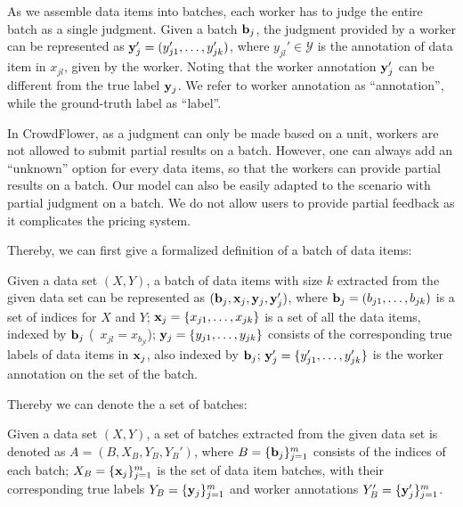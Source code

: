 
%

As we assemble data items into batches, 
each worker has to judge the entire batch as a single judgment.  
Given a batch ${\mathbf{b}}_j$, the judgment provided by a worker can be represented as ${\mathbf{y}}_j' = (y_{j1}', \ldots, y_{jk}')$, 
where $y_{jl}' \in \mathcal{Y}$ is the annotation of data item in $x_{jl}$, given by the worker.
Noting that the worker annotation ${\mathbf{y}}_j'$ can be different from the true label ${\mathbf{y}}_j$.  
We refer to worker annotation as ``annotation'', while the ground-truth label as ``label''.  

In CrowdFlower, as a judgment can only be made based on a unit,
workers are not allowed to submit partial results on a batch.
However, one can always add an ``unknown'' option for every data items,
so that the workers can provide partial results on a batch.
Our model can also be easily adapted to the scenario with partial judgment on a batch.
We do not allow users to provide partial feedback as it complicates the pricing system.  


Thereby, we can first give a formalized definition of a batch of data items:
\begin{definition}
[Batch]
Given a data set $(X, Y)$,
a batch of data items with size $k$ extracted from the given data set can be represented as $({\mathbf{b}}_j, {\mathbf{x}}_j, {\mathbf{y}}_j, {\mathbf{y}}_j')$, 
where ${\mathbf{b}}_j = (b_{j1}, \ldots, b_{jk})$ is a set of indices for $X$ and $Y$; 
${\mathbf{x}}_j = \{x_{j1}, \ldots, x_{jk}\}$ is a set of all the data items, indexed by ${\mathbf{b}}_j$ (\ie~$x_{jl} = x_{b_{jl}}$); 
${\mathbf{y}}_j = \{y_{j1}, \ldots, y_{jk}\}$ consists of the corresponding true labels of data items in ${\mathbf{x}}_j$, also indexed by ${\mathbf{b}}_j$; 
${\mathbf{y}}_j' = \{y_{j1}', \ldots, y_{jk}'\}$ is the worker annotation on the set of the batch.  
\end{definition}

Thereby we can denote the a set of batches:
\begin{definition}
Given a data set $(X, Y)$, 
a set of batches extracted from the given data set is denoted as $A = (B, X_B, Y_B, Y_B')$, 
where $B=\{{\mathbf{b}}_j\}_{j=1}^m$ consists of the indices of each batch; 
$X_B=\{{\mathbf{x}}_j\}_{j=1}^m$ is the set of data item batches, 
with their corresponding true labels $Y_B=\{{\mathbf{y}}_j\}_{j=1}^m$ 
and worker annotations $Y_B'=\{{\mathbf{y}}_j'\}_{j=1}^m$.  
\end{definition}

